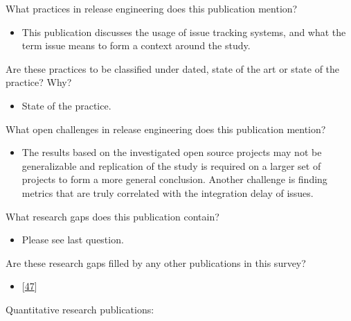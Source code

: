 \documentclass[]{book}
\providecommand{\tightlist}{%
  \setlength{\itemsep}{0pt}\setlength{\parskip}{0pt}}
\begin{document}
What practices in release engineering does this publication mention?

\begin{itemize}
\tightlist
\item
  This publication discusses the usage of issue tracking systems, and
  what the term issue means to form a context around the study.
\end{itemize}

Are these practices to be classified under dated, state of the art or
state of the practice? Why?

\begin{itemize}
\tightlist
\item
  State of the practice.
\end{itemize}

What open challenges in release engineering does this publication
mention?

\begin{itemize}
\tightlist
\item
  The results based on the investigated open source projects may not be
  generalizable and replication of the study is required on a larger set
  of projects to form a more general conclusion. Another challenge is
  finding metrics that are truly correlated with the integration delay
  of issues.
\end{itemize}

What research gaps does this publication contain?

\begin{itemize}
\tightlist
\item
  Please see last question.
\end{itemize}

Are these research gaps filled by any other publications in this survey?

\begin{itemize}
\tightlist
\item
  {[}\protect\hyperlink{ref-da2016a}{47}{]}
\end{itemize}

Quantitative research publications:
\end{document}
